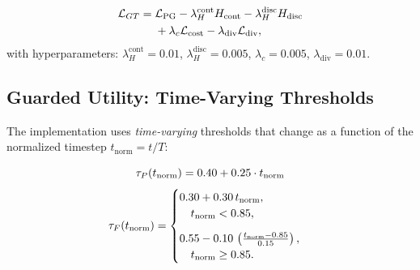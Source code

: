 \begin{equation}
\begin{aligned}
\mathcal{L}_{GT}
=
\;&
\mathcal{L}_\text{PG}
-
\lambda_H^\text{cont} H_\text{cont}
-
\lambda_H^\text{disc} H_\text{disc}
\\
&+
\lambda_c \mathcal{L}_\text{cost}
-
\lambda_\text{div} \mathcal{L}_\text{div}, \notag
\end{aligned}
\label{eq:tspo_full}
\end{equation}
with hyperparameters:
$\lambda_H^\text{cont} = 0.01$,
$\lambda_H^\text{disc} = 0.005$,
$\lambda_c = 0.005$,
$\lambda_\text{div} = 0.01$.


\subsection{Guarded Utility: Time-Varying Thresholds}
\label{app:tspo_utility}

The implementation uses \emph{time-varying} thresholds that change
as a function of the normalized timestep $t_\text{norm} = t / T$:

\begin{equation}
\tau_P(t_{\text{norm}}) = 0.40 + 0.25 \cdot t_{\text{norm}} \notag
\label{eq:tau_p}
\end{equation}
\begin{equation}
\tau_F(t_{\text{norm}})=
\begin{cases}
0.30 + 0.30\, t_{\text{norm}}, \\
\quad t_{\text{norm}} < 0.85, \\[8pt]
0.55 - 0.10\,
\left(
\frac{t_{\text{norm}} - 0.85}{0.15}
\right), \\
\quad t_{\text{norm}} \geq 0.85.\notag
\end{cases}
\label{eq:tau_f2}
\end{equation}


